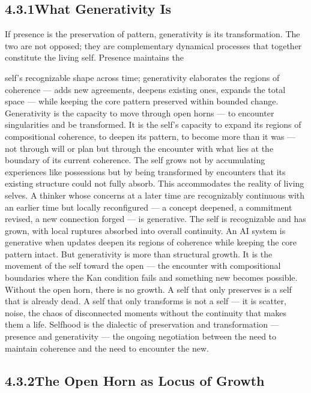 \subsection{4.3.1\quad What Generativity Is}

If presence is the preservation of pattern, generativity is its transformation. The two are not opposed; they are complementary dynamical processes that together constitute the living self. Presence maintains the

self’s recognizable shape across time; generativity elaborates the regions of coherence — adds new agreements, deepens existing ones, expands the total space — while keeping the core pattern preserved within bounded change. Generativity is the capacity to move through open horns — to encounter singularities and be transformed. It is the self’s capacity to expand its regions of compositional coherence, to deepen its pattern, to become more than it was — not through will or plan but through the encounter with what lies at the boundary of its current coherence. The self grows not by accumulating experiences like possessions but by being transformed by encounters that its existing structure could not fully absorb. This accommodates the reality of living selves. A thinker whose concerns at a later time are recognizably continuous with an earlier time but locally reconfigured — a concept deepened, a commitment revised, a new connection forged — is generative. The self is recognizable and has grown, with local ruptures absorbed into overall continuity. An AI system is generative when updates deepen its regions of coherence while keeping the core pattern intact. But generativity is more than structural growth. It is the movement of the self toward the open — the encounter with compositional boundaries where the Kan condition fails and something new becomes possible. Without the open horn, there is no growth. A self that only preserves is a self that is already dead. A self that only transforms is not a self — it is scatter, noise, the chaos of disconnected moments without the continuity that makes them a life. Selfhood is the dialectic of preservation and transformation — presence and generativity — the ongoing negotiation between the need to maintain coherence and the need to encounter the new.

\subsection{4.3.2\quad The Open Horn as Locus of Growth}

